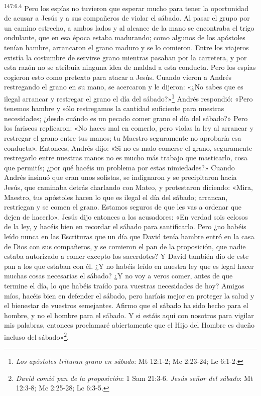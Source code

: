 \par
\textsuperscript{147:6.4} Pero los espías no tuvieron que esperar mucho para tener la oportunidad de acusar a Jesús y a sus compañeros de violar el sábado. Al pasar el grupo por un camino estrecho, a ambos lados y al alcance de la mano se encontraba el trigo ondulante, que en esa época estaba madurando; como algunos de los apóstoles tenían hambre, arrancaron el grano maduro y se lo comieron. Entre los viajeros existía la costumbre de servirse grano mientras pasaban por la carretera, y por esta razón no se atribuía ninguna idea de maldad a esta conducta. Pero los espías cogieron esto como pretexto para atacar a Jesús. Cuando vieron a Andrés restregando el grano en su mano, se acercaron y le dijeron: «¿No sabes que es ilegal arrancar y restregar el grano el día del sábado?»\footnote{\textit{Los apóstoles trituran grano en sábado}: Mt 12:1-2; Mc 2:23-24; Lc 6:1-2.} Andrés respondió: «Pero tenemos hambre y sólo restregamos la cantidad suficiente para nuestras necesidades; ¿desde cuándo es un pecado comer grano el día del sábado?» Pero los fariseos replicaron: «No haces mal en comerlo, pero violas la ley al arrancar y restregar el grano entre tus manos; tu Maestro seguramente no aprobaría esa conducta». Entonces, Andrés dijo: «Si no es malo comerse el grano, seguramente restregarlo entre nuestras manos no es mucho más trabajo que masticarlo, cosa que permitís; ¿por qué hacéis un problema por estas nimiedades?» Cuando Andrés insinuó que eran unos sofistas, se indignaron y se precipitaron hacia Jesús, que caminaba detrás charlando con Mateo, y protestaron diciendo: «Mira, Maestro, tus apóstoles hacen lo que es ilegal el día del sábado; arrancan, restriegan y se comen el grano. Estamos seguros de que les vas a ordenar que dejen de hacerlo». Jesús dijo entonces a los acusadores: «En verdad sois celosos de la ley, y hacéis bien en recordar el sábado para santificarlo. Pero ¿no habéis leído nunca en las Escrituras que un día que David tenía hambre entró en la casa de Dios con sus compañeros, y se comieron el pan de la proposición, que nadie estaba autorizado a comer excepto los sacerdotes? Y David también dio de este pan a los que estaban con él. ¿Y no habéis leído en nuestra ley que es legal hacer muchas cosas necesarias el sábado? ¿Y no voy a veros comer, antes de que termine el día, lo que habéis traído para vuestras necesidades de hoy? Amigos míos, hacéis bien en defender el sábado, pero haríais mejor en proteger la salud y el bienestar de vuestros semejantes. Afirmo que el sábado ha sido hecho para el hombre, y no el hombre para el sábado. Y si estáis aquí con nosotros para vigilar mis palabras, entonces proclamaré abiertamente que el Hijo del Hombre es dueño incluso del sábado»\footnote{\textit{David comió pan de la proposición}: 1 Sam 21:3-6. \textit{Jesús señor del sábado}: Mt 12:3-8; Mc 2:25-28; Lc 6:3-5.}.

